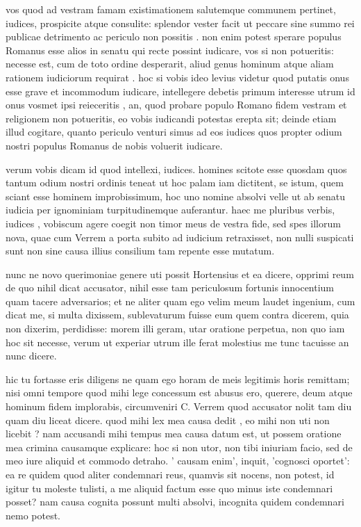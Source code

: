  vos quod ad vestram famam existimationem salutemque communem pertinet, iudices, prospicite atque consulite: splendor vester facit ut peccare sine summo rei publicae detrimento ac periculo non possitis . non enim potest sperare populus Romanus esse alios in senatu qui recte possint iudicare, vos si non potueritis: necesse est, cum de toto ordine desperarit, aliud genus hominum atque aliam rationem iudiciorum requirat . hoc si vobis ideo levius videtur quod putatis onus esse grave et incommodum iudicare, intellegere debetis primum interesse utrum id onus vosmet ipsi reieceritis , an, quod probare populo Romano fidem vestram et religionem non potueritis, eo vobis iudicandi potestas erepta sit; deinde etiam illud cogitare, quanto periculo venturi simus ad eos iudices quos propter odium nostri populus Romanus de nobis voluerit iudicare.

 verum vobis dicam id quod intellexi, iudices. homines scitote esse quosdam quos tantum odium nostri ordinis teneat ut hoc palam iam dictitent, se istum, quem sciant esse hominem improbissimum, hoc uno nomine absolvi velle ut ab senatu iudicia per ignominiam turpitudinemque auferantur. haec me pluribus verbis, iudices , vobiscum agere coegit non timor meus de vestra fide, sed spes illorum nova, quae cum Verrem a porta subito ad iudicium retraxisset, non nulli suspicati sunt non sine causa illius consilium tam repente esse mutatum.

 nunc ne novo querimoniae genere uti possit Hortensius et ea dicere, opprimi reum de quo nihil dicat accusator, nihil esse tam periculosum fortunis innocentium quam tacere adversarios; et ne aliter quam ego velim meum laudet ingenium, cum dicat me, si multa dixissem, sublevaturum fuisse eum quem contra dicerem, quia non dixerim, perdidisse: morem illi geram, utar oratione perpetua, non quo iam hoc sit necesse, verum ut experiar utrum ille ferat molestius me tunc tacuisse an nunc dicere.

 hic tu fortasse eris diligens ne quam ego horam de meis legitimis horis remittam; nisi omni tempore quod mihi lege concessum est abusus ero, querere, deum atque hominum fidem implorabis, circumveniri C. Verrem quod accusator nolit tam diu quam diu liceat dicere. quod mihi lex mea causa dedit , eo mihi non uti non licebit ? nam accusandi mihi tempus mea causa datum est, ut possem oratione mea crimina causamque explicare: hoc si non utor, non tibi iniuriam facio, sed de meo iure aliquid et commodo detraho. ' causam enim', inquit, 'cognosci oportet': ea re quidem quod aliter condemnari reus, quamvis sit nocens, non potest, id igitur tu moleste tulisti, a me aliquid factum esse quo minus iste condemnari posset? nam causa cognita possunt multi absolvi, incognita quidem condemnari nemo potest.

